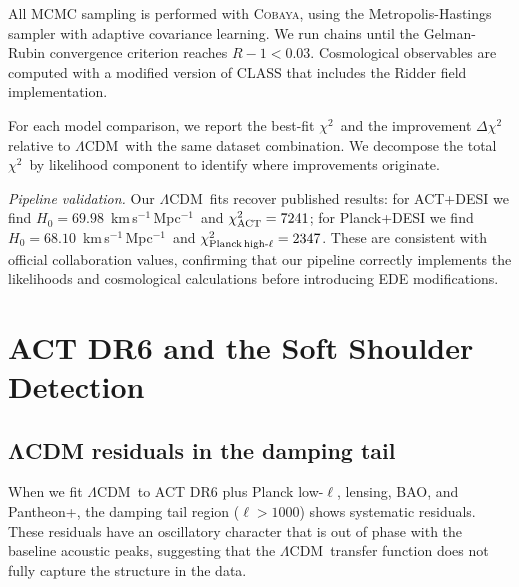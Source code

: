 \documentclass[twocolumn,showpacs,preprintnumbers,amsmath,amssymb,prd]{revtex4-2}
\newcommand{\lcdm}{$\Lambda$CDM}
\newcommand{\chisq}{$\chi^2$}
\newcommand{\kms}{km\,s$^{-1}$\,Mpc$^{-1}$}
\begin{document}
All MCMC sampling is performed with \textsc{Cobaya}, using the Metropolis-Hastings 
sampler with adaptive covariance learning. We run chains until the Gelman-Rubin 
convergence criterion reaches $R - 1 < 0.03$. Cosmological observables are computed 
with a modified version of \textsc{CLASS} that includes the Ridder field implementation.

For each model comparison, we report the best-fit \chisq\ and the improvement 
$\Delta\chi^2$ relative to \lcdm\ with the same dataset combination. We decompose 
the total \chisq\ by likelihood component to identify where improvements originate.

\emph{Pipeline validation.} Our \lcdm\ fits recover published results: for 
ACT+DESI we find $H_0 = 69.98$~\kms\ and $\chi^2_{\rm ACT} = 7241$; for 
Planck+DESI we find $H_0 = 68.10$~\kms\ and $\chi^2_{\rm Planck\,high\text{-}\ell} 
= 2347$. These are consistent with official collaboration values, confirming 
that our pipeline correctly implements the likelihoods and cosmological 
calculations before introducing EDE modifications.

\section{ACT DR6 and the Soft Shoulder Detection}
\label{sec:act}

\subsection{ΛCDM residuals in the damping tail}

When we fit \lcdm\ to ACT DR6 plus Planck low-$\ell$, lensing, BAO, and Pantheon+, 
the damping tail region ($\ell > 1000$) shows systematic residuals. These residuals 
have an oscillatory character that is out of phase with the baseline acoustic peaks, 
suggesting that the \lcdm\ transfer function does not fully capture the structure 
in the data.
\end{document}
